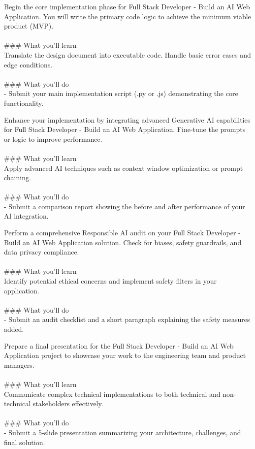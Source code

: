 \documentclass{article}
\begin{document}
Begin the core implementation phase for Full Stack Developer - Build an AI Web Application. You will write the primary code logic to achieve the minimum viable product (MVP). \\
 \\
### What you'll learn \\
Translate the design document into executable code. Handle basic error cases and edge conditions. \\
 \\
### What you'll do \\
- Submit your main implementation script (.py or .js) demonstrating the core functionality.

Enhance your implementation by integrating advanced Generative AI capabilities for Full Stack Developer - Build an AI Web Application. Fine-tune the prompts or logic to improve performance. \\
 \\
### What you'll learn \\
Apply advanced AI techniques such as context window optimization or prompt chaining. \\
 \\
### What you'll do \\
- Submit a comparison report showing the before and after performance of your AI integration.

Perform a comprehensive Responsible AI audit on your Full Stack Developer - Build an AI Web Application solution. Check for biases, safety guardrails, and data privacy compliance. \\
 \\
### What you'll learn \\
Identify potential ethical concerns and implement safety filters in your application. \\
 \\
### What you'll do \\
- Submit an audit checklist and a short paragraph explaining the safety measures added.

Prepare a final presentation for the Full Stack Developer - Build an AI Web Application project to showcase your work to the engineering team and product managers. \\
 \\
### What you'll learn \\
Communicate complex technical implementations to both technical and non-technical stakeholders effectively. \\
 \\
### What you'll do \\
- Submit a 5-slide presentation summarizing your architecture, challenges, and final solution.
\end{document}
